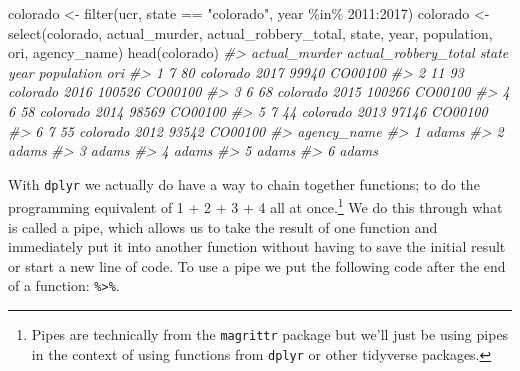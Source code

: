 \documentclass[
]{krantz}
\makeatletter
\newenvironment{Shaded}{\begin{snugshade}}{\end{snugshade}}
\newcommand{\CommentTok}[1]{\textcolor[rgb]{0.37,0.37,0.37}{\textit{#1}}}
\newcommand{\DecValTok}[1]{\textcolor[rgb]{0.06,0.06,0.06}{#1}}
\newcommand{\FunctionTok}[1]{\textcolor[rgb]{0,0,0}{#1}}
\newcommand{\NormalTok}[1]{#1}
\newcommand{\OtherTok}[1]{\textcolor[rgb]{0.37,0.37,0.37}{#1}}
\newcommand{\SpecialCharTok}[1]{\textcolor[rgb]{0,0,0}{#1}}
\newcommand{\StringTok}[1]{\textcolor[rgb]{0.5,0.5,0.5}{#1}}
\newenvironment{kframe}{%
\medskip{}
\setlength{\fboxsep}{.8em}
 \def\at@end@of@kframe{}%
 \ifinner\ifhmode%
  \def\at@end@of@kframe{\end{minipage}}%
  \begin{minipage}{\columnwidth}%
 \fi\fi%
 \def\FrameCommand##1{\hskip\@totalleftmargin \hskip-\fboxsep
 \colorbox{shadecolor}{##1}\hskip-\fboxsep
     \hskip-\linewidth \hskip-\@totalleftmargin \hskip\columnwidth}%
 \MakeFramed {\advance\hsize-\width
   \@totalleftmargin\z@ \linewidth\hsize
   \@setminipage}}%
 {\par\unskip\endMakeFramed%
 \at@end@of@kframe}
\renewenvironment{Shaded}{\begin{kframe}}{\end{kframe}}
\makeatother
\begin{document}
\begin{Shaded}
\begin{Highlighting}[]
\NormalTok{colorado }\OtherTok{\textless{}{-}} \FunctionTok{filter}\NormalTok{(ucr, state }\SpecialCharTok{==} \StringTok{"colorado"}\NormalTok{,}
\NormalTok{                   year }\SpecialCharTok{\%in\%} \DecValTok{2011}\SpecialCharTok{:}\DecValTok{2017}\NormalTok{)}
\NormalTok{colorado }\OtherTok{\textless{}{-}} \FunctionTok{select}\NormalTok{(colorado,}
\NormalTok{                   actual\_murder, }
\NormalTok{                   actual\_robbery\_total,}
\NormalTok{                   state, }
\NormalTok{                   year,}
\NormalTok{                   population,}
\NormalTok{                   ori,}
\NormalTok{                   agency\_name)}
\FunctionTok{head}\NormalTok{(colorado)}
\CommentTok{\#\textgreater{}   actual\_murder actual\_robbery\_total    state year population     ori}
\CommentTok{\#\textgreater{} 1             7                   80 colorado 2017      99940 CO00100}
\CommentTok{\#\textgreater{} 2            11                   93 colorado 2016     100526 CO00100}
\CommentTok{\#\textgreater{} 3             6                   68 colorado 2015     100266 CO00100}
\CommentTok{\#\textgreater{} 4             6                   58 colorado 2014      98569 CO00100}
\CommentTok{\#\textgreater{} 5             7                   44 colorado 2013      97146 CO00100}
\CommentTok{\#\textgreater{} 6             7                   55 colorado 2012      93542 CO00100}
\CommentTok{\#\textgreater{}   agency\_name}
\CommentTok{\#\textgreater{} 1       adams}
\CommentTok{\#\textgreater{} 2       adams}
\CommentTok{\#\textgreater{} 3       adams}
\CommentTok{\#\textgreater{} 4       adams}
\CommentTok{\#\textgreater{} 5       adams}
\CommentTok{\#\textgreater{} 6       adams}
\end{Highlighting}
\end{Shaded}

With \texttt{dplyr} we actually do have a way to chain together functions; to do the programming equivalent of 1 + 2 + 3 + 4 all at once.\footnote{Pipes are technically from the \texttt{magrittr} package but we'll just be using pipes in the context of using functions from \texttt{dplyr} or other tidyverse packages.} We do this through what is called a pipe, which allows us to take the result of one function and immediately put it into another function without having to save the initial result or start a new line of code. To use a pipe we put the following code after the end of a function: \texttt{\%\textgreater{}\%}.
\end{document}
